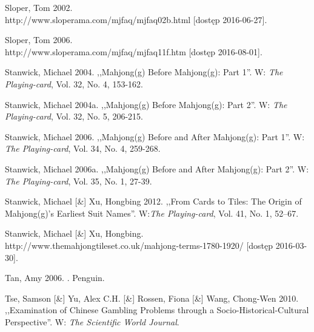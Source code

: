 Sloper, Tom 2002. 
\\http://www.sloperama.com/mjfaq/mjfaq02b.html [dostęp
2016-06-27].

Sloper, Tom 2006. 
\\http://www.sloperama.com/mjfaq/mjfaq11f.htm [dostęp 2016-08-01].

Stanwick, Michael 2004. ,,Mahjong(g) Before Mahjong(g): Part 1''. W:
\textit{The Playing-card}, Vol. 32, No. 4, 153-162.

Stanwick, Michael 2004a. ,,Mahjong(g) Before Mahjong(g): Part 2''. W:
\textit{The Playing-card}, Vol. 32, No. 5, 206-215.

Stanwick, Michael 2006. ,,Mahjong(g) Before and After Mahjong(g): Part 1''. W:
\textit{The Playing-card}, Vol. 34, No. 4, 259-268.

Stanwick, Michael 2006a. ,,Mahjong(g) Before and After Mahjong(g): Part 2''. W:
\textit{The Playing-card}, Vol. 35, No. 1, 27-39.


Stanwick, Michael [\&] Xu, Hongbing 2012. ,,From Cards to Tiles: The Origin of
\mbox{Mahjong(g)'s} Earliest Suit Names''. W:\textit{The Playing-card}, Vol. 41,
No.
1, 52–67.

Stanwick, Michael [\&] Xu, Hongbing. 
\\http://www.themahjongtileset.co.uk/mahjong-terms-1780-1920/ [dostęp
2016-03-30].

Tan, Amy 2006. . Penguin.

Tse, Samson [\&] Yu, Alex C.H. [\&] Rossen, Fiona [\&] Wang, Chong-Wen
2010.
,,Examination of Chinese Gambling Problems through a Socio-Historical-Cultural Perspective''. W: \textit{The
Scientific World Journal}.

